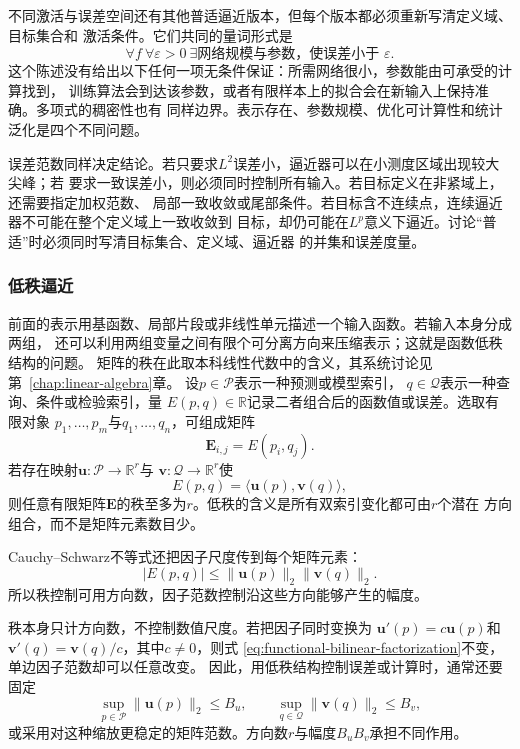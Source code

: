 不同激活与误差空间还有其他普适逼近版本，但每个版本都必须重新写清定义域、目标集合和
激活条件。它们共同的量词形式是
\[
  \forall f\ \forall\varepsilon>0\
  \exists\text{网络规模与参数，使误差小于 }\varepsilon.
\]
这个陈述没有给出以下任何一项无条件保证：所需网络很小，参数能由可承受的计算找到，
训练算法会到达该参数，或者有限样本上的拟合会在新输入上保持准确。多项式的稠密性也有
同样边界。表示存在、参数规模、优化可计算性和统计泛化是四个不同问题。

误差范数同样决定结论。若只要求$L^2$误差小，逼近器可以在小测度区域出现较大尖峰；若
要求一致误差小，则必须同时控制所有输入。若目标定义在非紧域上，还需要指定加权范数、
局部一致收敛或尾部条件。若目标含不连续点，连续逼近器不可能在整个定义域上一致收敛到
目标，却仍可能在$L^p$意义下逼近。讨论“普适”时必须同时写清目标集合、定义域、逼近器
的并集和误差度量。

\subsubsection{低秩逼近}

前面的表示用基函数、局部片段或非线性单元描述一个输入函数。若输入本身分成两组，
还可以利用两组变量之间有限个可分离方向来压缩表示；这就是函数低秩结构的问题。
矩阵的秩在此取本科线性代数中的含义，其系统讨论见第~\ref{chap:linear-algebra}章。
设$p\in\mathcal{P}$表示一种预测或模型索引，
$q\in\mathcal{Q}$表示一种查询、条件或检验索引，量
$E(p,q)\in\mathbb{R}$记录二者组合后的函数值或误差。选取有限对象
$p_1,\ldots,p_m$与$q_1,\ldots,q_n$，可组成矩阵
\[
  \bm{E}_{i,j}=E(p_i,q_j).
\]
若存在映射$\bm{u}:\mathcal{P}\to\mathbb{R}^r$与
$\bm{v}:\mathcal{Q}\to\mathbb{R}^r$使
\begin{equation}
  E(p,q)
  =
  \langle\bm{u}(p),\bm{v}(q)\rangle,
  \label{eq:functional-bilinear-factorization}
\end{equation}
则任意有限矩阵$\bm{E}$的秩至多为$r$。低秩的含义是所有双索引变化都可由$r$个潜在
方向组合，而不是矩阵元素数目少。

Cauchy--Schwarz不等式还把因子尺度传到每个矩阵元素：
\[
  |E(p,q)|
  \leq
  \lVert\bm{u}(p)\rVert_2
  \lVert\bm{v}(q)\rVert_2.
\]
所以秩控制可用方向数，因子范数控制沿这些方向能够产生的幅度。

秩本身只计方向数，不控制数值尺度。若把因子同时变换为
$\bm{u}'(p)=c\bm{u}(p)$和
$\bm{v}'(q)=\bm{v}(q)/c$，其中$c\neq0$，则式
\eqref{eq:functional-bilinear-factorization}不变，单边因子范数却可以任意改变。
因此，用低秩结构控制误差或计算时，通常还要固定
\[
  \sup_{p\in\mathcal{P}}\lVert\bm{u}(p)\rVert_2\leq B_u,
  \qquad
  \sup_{q\in\mathcal{Q}}\lVert\bm{v}(q)\rVert_2\leq B_v,
\]
或采用对这种缩放更稳定的矩阵范数。方向数$r$与幅度$B_uB_v$承担不同作用。

